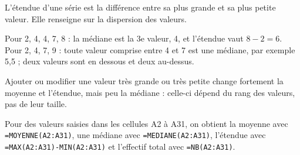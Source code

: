 \begin{definition}L’étendue d’une série est la différence entre sa plus grande et sa plus petite valeur. Elle renseigne sur la dispersion des valeurs.\end{definition}
\begin{exemple}Pour 2, 4, 4, 7, 8 : la médiane est la 3e valeur, 4, et l’étendue vaut $8-2=6$. Pour 2, 4, 7, 9 : toute valeur comprise entre 4 et 7 est une médiane, par exemple 5,5 ; deux valeurs sont en dessous et deux au-dessus.\end{exemple}
\begin{propriete}Ajouter ou modifier une valeur très grande ou très petite change fortement la moyenne et l’étendue, mais peu la médiane : celle-ci dépend du rang des valeurs, pas de leur taille.\end{propriete}
\begin{savoirfaire}Pour des valeurs saisies dans les cellules A2 à A31, on obtient la moyenne avec \texttt{=MOYENNE(A2:A31)}, une médiane avec \texttt{=MEDIANE(A2:A31)}, l’étendue avec \texttt{=MAX(A2:A31)-MIN(A2:A31)} et l’effectif total avec \texttt{=NB(A2:A31)}.\end{savoirfaire}

